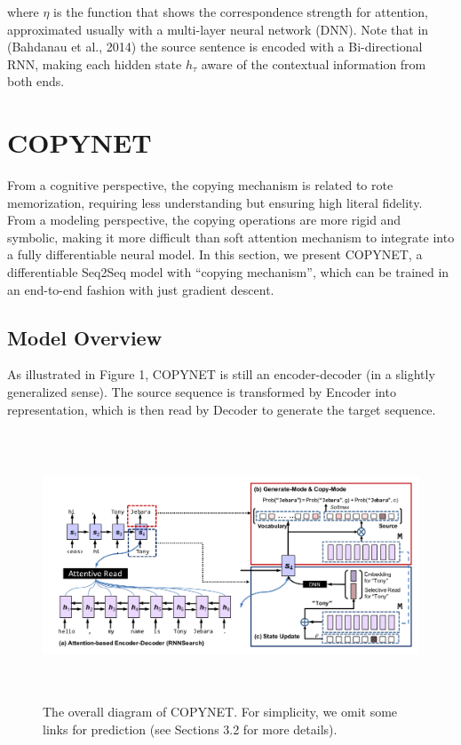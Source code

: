 \documentclass[UTF8]{ctexart}
\begin{document}
    where $\eta$ is the function that shows the correspondence strength for attention, approximated usually
    with a multi-layer neural network (DNN). Note that in (Bahdanau et al., 2014) the source sentence is 
    encoded with a Bi-directional RNN, making each hidden state $h_\tau$ aware of the contextual
    information from both ends.

    \section{COPYNET}
    From a cognitive perspective, the copying mechanism is related to rote memorization, requiring
    less understanding but ensuring high literal fidelity. From a modeling perspective, the copying
    operations are more rigid and symbolic, making
    it more difficult than soft attention mechanism to
    integrate into a fully differentiable neural model.
    In this section, we present COPYNET, a differentiable Seq2Seq model with “copying mechanism”,
    which can be trained in an end-to-end fashion with
    just gradient descent.
    \subsection{Model Overview}
    As illustrated in Figure 1, COPYNET is still an
    encoder-decoder (in a slightly generalized sense).
    The source sequence is transformed by Encoder
    into representation, which is then read by Decoder
    to generate the target sequence.

\begin{figure}[htbp]
    \centering
    \vspace{-0.35cm} 
    \includegraphics[width=14cm,height=8cm]{pictures/model.jpg}
    \caption{The overall diagram of COPYNET. For simplicity, we omit some links for prediction (see
    Sections 3.2 for more details).}
\end{figure}
\end{document}
